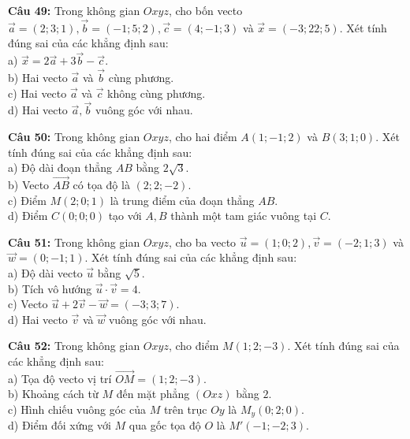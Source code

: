 \documentclass[12pt]{article}
\begin{document}
	\vspace{4mm}
	\noindent \textbf{Câu 49:} Trong không gian $Oxyz$, cho bốn vecto $\vec{a} = (2; 3; 1), \vec{b} = (-1; 5; 2), \vec{c} = (4; -1; 3)$ và $\vec{x} = (-3; 22; 5)$. Xét tính đúng sai của các khẳng định sau: \\
	\noindent a) $\vec{x} = 2\vec{a} + 3\vec{b} - \vec{c}$. \\
	\noindent b) Hai vecto $\vec{a}$ và $\vec{b}$ cùng phương. \\
	\noindent c) Hai vecto $\vec{a}$ và $\vec{c}$ không cùng phương. \\
	\noindent d) Hai vecto $\vec{a}, \vec{b}$ vuông góc với nhau.
	
	\vspace{4mm}
	\noindent \textbf{Câu 50:} Trong không gian $Oxyz$, cho hai điểm $A(1; -1; 2)$ và $B(3; 1; 0)$. Xét tính đúng sai của các khẳng định sau: \\
	\noindent a) Độ dài đoạn thẳng $AB$ bằng $2\sqrt{3}$. \\
	\noindent b) Vecto $\vec{AB}$ có tọa độ là $(2; 2; -2)$. \\
	\noindent c) Điểm $M(2; 0; 1)$ là trung điểm của đoạn thẳng $AB$. \\
	\noindent d) Điểm $C(0; 0; 0)$ tạo với $A, B$ thành một tam giác vuông tại $C$.
	
	\vspace{4mm}
	\noindent \textbf{Câu 51:} Trong không gian $Oxyz$, cho ba vecto $\vec{u} = (1; 0; 2), \vec{v} = (-2; 1; 3)$ và $\vec{w} = (0; -1; 1)$. Xét tính đúng sai của các khẳng định sau: \\
	\noindent a) Độ dài vecto $\vec{u}$ bằng $\sqrt{5}$. \\
	\noindent b) Tích vô hướng $\vec{u} \cdot \vec{v} = 4$. \\
	\noindent c) Vecto $\vec{u} + 2\vec{v} - \vec{w} = (-3; 3; 7)$. \\
	\noindent d) Hai vecto $\vec{v}$ và $\vec{w}$ vuông góc với nhau.
	
	\vspace{4mm}
	\noindent \textbf{Câu 52:} Trong không gian $Oxyz$, cho điểm $M(1; 2; -3)$. Xét tính đúng sai của các khẳng định sau: \\
	\noindent a) Tọa độ vecto vị trí $\vec{OM} = (1; 2; -3)$. \\
	\noindent b) Khoảng cách từ $M$ đến mặt phẳng $(Oxz)$ bằng $2$. \\
	\noindent c) Hình chiếu vuông góc của $M$ trên trục $Oy$ là $M_y(0; 2; 0)$. \\
	\noindent d) Điểm đối xứng với $M$ qua gốc tọa độ $O$ là $M'(-1; -2; 3)$.
	
\end{document}
